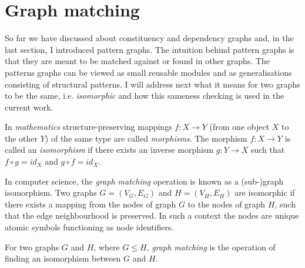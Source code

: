 \section{Graph matching}
\label{sec:graph-matching}

    So far we have discussed about constituency and dependency graphs and, in the last section, I introduced pattern graphs. The intuition behind pattern graphs is that they are meant to be matched against or found in other graphs. The patterns graphs can be viewed as small reusable modules and as generalisations consisting of structural patterns. I will address next what it means for two graphs to be the same, i.e. \textit{isomorphic} and how this sameness checking is used in the current work. 

    In \textit{mathematics} structure-preserving mappings $f:X \rightarrow Y$ (from one object $X$ to the other $Y$) of the same type are called \textit{morphisms}. The morphism $f:X \rightarrow Y$ is called an \textit{isomorphism} if there exists an inverse morphism $g:Y \rightarrow X$ such that $f \circ g = id_{X}$ and $ g \circ f = id_{X}$.


    In computer science, the \textit{graph matching} operation is known as a (sub-)graph isomorphism. Two graphs $G=(V_G,E_G)$ and $H=(V_H,E_H)$ are isomorphic if there exists a mapping from the nodes of graph $G$ to the nodes of graph $H$, such that the edge neighbourhood is preserved. In such a context the nodes are unique atomic symbols functioning as node identifiers. 
 
    \begin{definition}\label{def:gmatching}
        For two graphs $G$ and $H$, where $G \leq H$, \textit{graph matching} is the operation of finding an isomorphism between $G$ and $H$.
    \end{definition}

